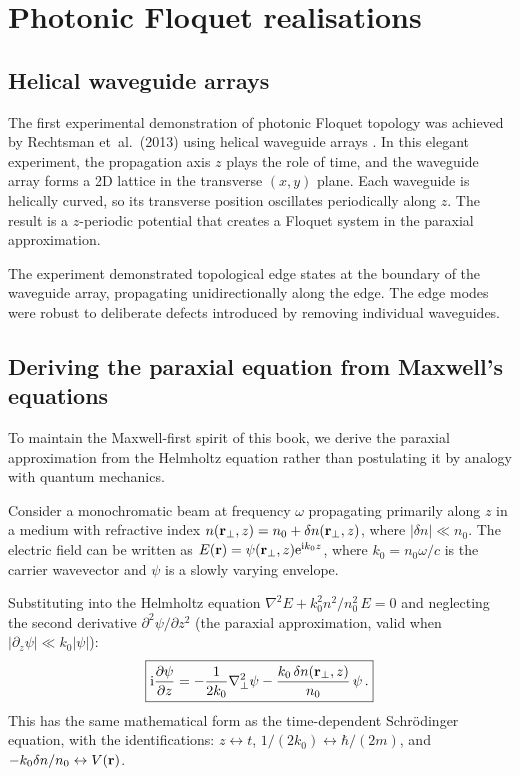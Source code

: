 \section{Photonic Floquet realisations}
\label{sec:ch13-realisations}

\subsection{Helical waveguide arrays}
\label{sec:ch13-waveguide-arrays}

The first experimental demonstration of photonic Floquet topology was
achieved by Rechtsman et~al.\ (2013) using helical waveguide arrays
\cite{rechtsman2013photonica,maczewsky2017observation,yang2020photonic}.  In this elegant experiment, the
propagation axis $z$ plays the role of time, and the waveguide array
forms a 2D lattice in the transverse $(x,y)$ plane.  Each waveguide is
helically curved, so its transverse position oscillates periodically
along $z$.  The result is a $z$-periodic potential that creates a Floquet
system in the paraxial approximation.

The experiment demonstrated topological edge states at the boundary of
the waveguide array, propagating unidirectionally along the edge.  The
edge modes were robust to deliberate defects introduced by removing
individual waveguides.

\subsection{Deriving the paraxial equation from Maxwell's equations}
\label{sec:ch13-paraxial}

To maintain the Maxwell-first spirit of this book, we derive the
paraxial approximation from the Helmholtz equation rather than
postulating it by analogy with quantum mechanics.

Consider a monochromatic beam at frequency $\omega$ propagating
primarily along $z$ in a medium with refractive index
$n(\mathbf{r}_\perp,z)=n_0+\delta n(\mathbf{r}_\perp,z)$, where
$|\delta n|\ll n_0$.  The electric field can be written as
$E(\mathbf{r})=\psi(\mathbf{r}_\perp,z)\mathrm{e}^{\mathrm{i} k_0 z}$, where
$k_0=n_0\omega/c$ is the carrier wavevector and $\psi$ is a slowly
varying envelope.

Substituting into the Helmholtz equation
$\nabla^2 E + k_0^2 n^2/n_0^2\,E = 0$ and neglecting the second
derivative $\partial^2\psi/\partial z^2$ (the paraxial approximation,
valid when $|\partial_z\psi|\ll k_0|\psi|$):
\begin{equation}\label{eq:ch13-paraxial}
  \boxed{%
  \ii\pderiv{\psi}{z}
  = -\frac{1}{2k_0}\nabla_\perp^2\psi
  - \frac{k_0\,\delta n(\rvec_\perp,z)}{n_0}\,\psi\,.}
\end{equation}
This has the same mathematical form as the time-dependent
Schr\"odinger equation, with the identifications: $z\leftrightarrow t$,
$1/(2k_0)\leftrightarrow\hbar/(2m)$, and
$-k_0\delta n/n_0\leftrightarrow V(\mathbf{r})$.

